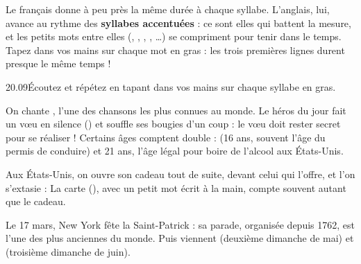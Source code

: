 
Le français donne à peu près la même durée à chaque syllabe. L'anglais, lui, avance au rythme des
\textbf{syllabes accentuées} : ce sont elles qui battent la mesure, et les petits mots entre elles
(, , , , …) se compriment pour tenir dans le temps. Tapez dans vos
mains sur chaque mot en gras : les trois premières lignes durent presque le même temps !

\begin{phrases}{20.09}{Écoutez et répétez en tapant dans vos mains sur chaque syllabe en gras.}
\end{phrases}


\begin{culture}
On chante , l'une des chansons les plus connues au monde. Le héros du jour
fait un vœu en silence () et souffle ses bougies d'un coup : le vœu doit rester secret
pour se réaliser ! Certains âges comptent double :  (16 ans, souvent l'âge du permis
de conduire) et 21 ans, l'âge légal pour boire de l'alcool aux États-Unis.
\end{culture}

\begin{paire}
\begin{culture}
Aux États-Unis, on ouvre son cadeau tout de suite, devant celui qui l'offre, et l'on s'extasie :
 La carte (), avec un petit mot écrit à la main,
compte souvent autant que le cadeau.
\end{culture}
\begin{culture}
Le 17 mars, New York fête la Saint-Patrick : sa parade, organisée depuis 1762, est l'une des plus
anciennes du monde. Puis viennent  (deuxième dimanche de mai) et 
(troisième dimanche de juin).
\end{culture}
\end{paire}

